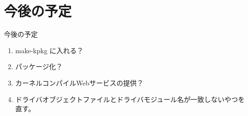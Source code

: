 \section{今後の予定}
\begin{frame}{今後の予定}
\begin{enumerate}
 \item make-kpkg に入れる？
 \item パッケージ化？
 \item カーネルコンパイルWebサービスの提供？
 \item ドライバオブジェクトファイルとドライバモジュール名が一致しないやつを直す。
\end{enumerate}
\end{frame}




